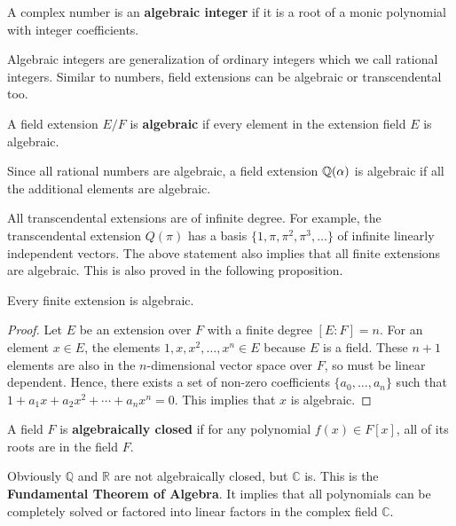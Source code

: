 \documentclass[../main.tex]{subfiles}
\begin{document}
\reversemarginpar
{}
\begin{definition}
A complex number is an \textbf{algebraic integer} if it is a root of a monic polynomial with integer coefficients. 
\end{definition}

Algebraic integers are generalization of ordinary integers which we call rational integers. 
Similar to numbers, field extensions can be algebraic or transcendental too. 

\reversemarginpar
{}
\begin{definition}
A field extension $E/F$ is \textbf{algebraic} if every element in the extension field $E$ is algebraic. 
\end{definition}
Since all rational numbers are algebraic, a field extension $\mathbb{Q}(\alpha)$ is algebraic if all the additional elements are algebraic. 

All transcendental extensions are of infinite degree. For example, the transcendental extension $Q(\pi)$ has a basis $\{1, \pi, \pi^2, \pi^3, \dots\}$ of infinite linearly independent vectors. The above statement also implies that all finite extensions are algebraic. This is also proved in the following proposition.  

\begin{proposition}
\label{prop:finite implies algebra}
Every finite extension is algebraic.
\end{proposition}
\begin{proof}
Let $E$ be an extension over $F$ with a finite degree $[E:F]=n$. For an element $x \in E$, the elements $1, x, x^2, \dots, x^n \in E$ because $E$ is a field. These $n+1$ elements are also in the $n$-dimensional vector space over $F$, so must be linear dependent. Hence, there exists a set of non-zero coefficients $\{a_0,\dots,a_n\}$ such that $1+a_1 x+a_2 x^2+\cdots+a_n x^n=0$. This implies that $x$ is algebraic. 
\end{proof}


\reversemarginpar
{}
\begin{definition}
A field $F$ is \textbf{algebraically closed} if for any polynomial $f(x) \in F[x]$, all of its roots are in the field $F$. 
\end{definition}
Obviously $\mathbb{Q}$ and $\mathbb{R}$ are not algebraically closed, but $\mathbb{C}$ is. This is the \textbf{Fundamental Theorem of Algebra}. It implies that all polynomials can be completely solved or factored into linear factors in the complex field $\mathbb{C}$. 
\end{document}
